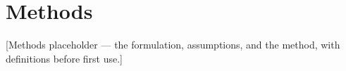 \section{Methods}
\label{sec:methods}
[Methods placeholder — the formulation, assumptions, and the method, with definitions before first use.]
